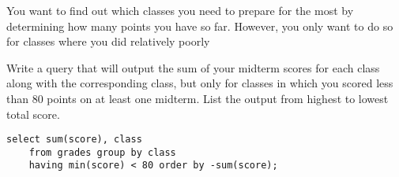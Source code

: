 \begin{blocksection}
\question 
You want to find out which classes you need to prepare for the most by determining how many points you have so far. However, you only want to do so for classes where you did relatively poorly

Write a query that will output the sum of your midterm scores for each class along with the corresponding class, but only for classes in which you scored less than 80 points on at least one midterm. List the output from highest to lowest total score.

\begin{solution}[1.5in]
\begin{lstlisting}
select sum(score), class
    from grades group by class
    having min(score) < 80 order by -sum(score);
\end{lstlisting}
\end{solution}
\end{blocksection}